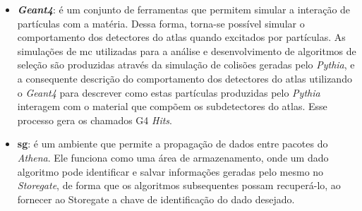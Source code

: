 \begin{itemize}
\begin{figure}[b!]
\begin{minipage}{\textwidth}
\setcounter{mpfootnote}{\value{footnote}}
\renewcommand{\thempfootnote}{\arabic{mpfootnote}}
\caption[Esboço de uma colisão simulada por Monte Carlo]{
Esboço de uma colisão simulada por Monte Carlo. Os prótons cruzantes estão
desenhados em azul escuro. Os globos em vermelho escuro representam processos de
colisão rígida dos hádrons em colisão. Fenômenos de \emph{bremsstrahlung} de
QCD{\footnote{Os fenômenos de \emph{bremsstrahlung} de QCD são parecidos 
com os mesmos para QED, explicados no Subtópico~{\ref{par:chuveiro_em}}, contudo, ao invés
de partículas eletricamente carregadas, é correspondente para partículas contendo
cores (a carga correspondente para a força forte) mas liberando glúons ao invés
de fótons. Os glúons, diferente dos fótons, podem sofrer de seu próprio
\emph{bremsstrahlung}}}
estão desenhados em azul para o estado inicial e vermelho para o estado
final. O modelo para Múltiplas Interações de Pártons (MPI), que no caso seria um
Evento Adjacente (UE) está em roxo. A hadronização dos pártons é representada
por elipses verde claro. Os decaimentos dos hádrons estão em verde escuro.
Finalmente, o \emph{bremsstrahlung} de QED é esboçado em amarelo.
Extraído de {\cite{mc_event}}.}
\setcounter{footnote}{\value{mpfootnote}}
\end{minipage}
\label{fig:evento_mc}
\end{figure}

\item \textbf{\emph{Geant4}}: é um conjunto de ferramentas que permitem simular a interação de
partículas com a matéria. Dessa forma, torna-se possível simular o comportamento
dos detectores do \gls{atlas} quando excitados por partículas. As simulações de
\gls{mc} utilizadas para a análise e desenvolvimento de algoritmos de seleção são
produzidas através da simulação de colisões geradas pelo \emph{Pythia}, e a consequente
descrição do comportamento dos detectores do \gls{atlas} utilizando o
\emph{Geant4} para descrever como estas partículas produzidas pelo \emph{Pythia} interagem 
com o material que compõem os subdetectores do \gls{atlas}. Esse processo gera
os chamados G4 \emph{Hits}.
\item \textbf{\gls{sg}}: é um ambiente que permite a propagação de dados entre pacotes do
\emph{Athena}. Ele funciona como uma área de armazenamento, onde um dado algoritmo pode
identificar e salvar informações geradas pelo mesmo no \emph{Storegate}, de forma que
os algoritmos subsequentes possam recuperá-lo, ao fornecer ao Storegate a chave
de identificação do dado desejado.
\end{itemize}

